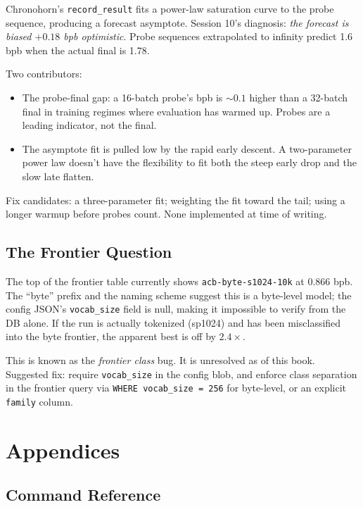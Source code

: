 \documentclass[11pt,openany]{book}
\theoremstyle{definition}
\theoremstyle{plain}
\begin{document}
Chronohorn's \texttt{record\_result} fits a power-law saturation curve
to the probe sequence, producing a forecast asymptote. Session 10's
diagnosis: \emph{the forecast is biased $+0.18$ bpb optimistic}. Probe
sequences extrapolated to infinity predict 1.6 bpb when the actual final
is 1.78.

Two contributors:
\begin{itemize}
  \item The probe-final gap: a 16-batch probe's bpb is $\sim 0.1$ higher
    than a 32-batch final in training regimes where evaluation has
    warmed up. Probes are a leading indicator, not the final.
  \item The asymptote fit is pulled low by the rapid early descent.
    A two-parameter power law doesn't have the flexibility to fit both
    the steep early drop and the slow late flatten.
\end{itemize}

Fix candidates: a three-parameter fit; weighting the fit toward the
tail; using a longer warmup before probes count. None implemented at
time of writing.

\chapter{The Frontier Question}

The top of the frontier table currently shows
\texttt{acb-byte-s1024-10k} at 0.866 bpb. The ``byte'' prefix and
the naming scheme suggest this is a byte-level model; the config
JSON's \texttt{vocab\_size} field is null, making it impossible to
verify from the DB alone. If the run is actually tokenized (sp1024) and
has been misclassified into the byte frontier, the apparent best is
off by $2.4\times$.

This is known as the \emph{frontier class} bug. It is unresolved as of
this book. Suggested fix: require \texttt{vocab\_size} in the config
blob, and enforce class separation in the frontier query via
\texttt{WHERE vocab\_size = 256} for byte-level, or an explicit
\texttt{family} column.

\appendix
\part{Appendices}

\chapter{Command Reference}
\label{ap:commands}
\end{document}
